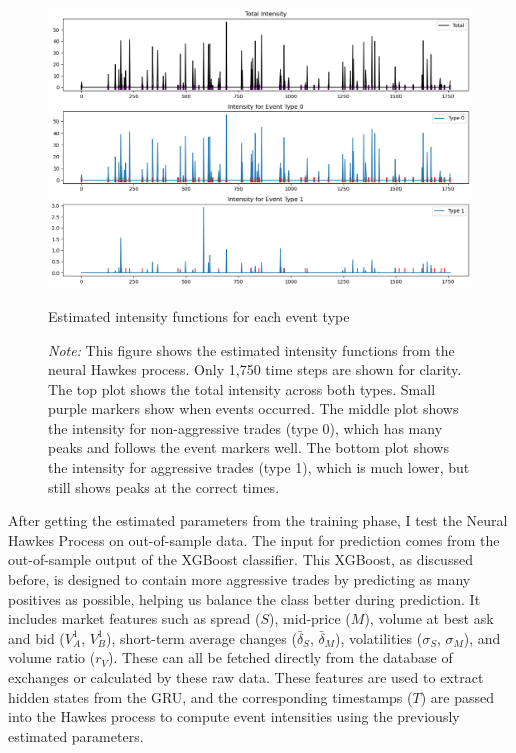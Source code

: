 \begin{figure}[tbp]
    \centering
    \includegraphics[width=0.95\linewidth]{figures/hp_estimation.png}
    \caption{Estimated intensity functions for each event type}
    \caption*{\textit{Note:} This figure shows the estimated intensity functions from the neural Hawkes process. Only 1,750 time steps are shown for clarity. The top plot shows the total intensity across both types. Small purple markers show when events occurred. The middle plot shows the intensity for non-aggressive trades (type 0), which has many peaks and follows the event markers well. The bottom plot shows the intensity for aggressive trades (type 1), which is much lower, but still shows peaks at the correct times.}

    \label{fig:neuralhp-intensity}
\end{figure}
\newpage
After getting the estimated parameters from the training phase, I test the Neural Hawkes Process on out-of-sample data. The input for prediction comes from the out-of-sample output of the XGBoost classifier. This XGBoost, as discussed before, is designed to contain more aggressive trades by predicting as many positives as possible, helping us balance the class better during prediction. It includes market features such as spread ($S$), mid-price ($M$), volume at best ask and bid ($V_A^1$, $V_B^1$), short-term average changes ($\bar{\delta}_S$, $\bar{\delta}_M$), volatilities ($\sigma_S$, $\sigma_M$), and volume ratio ($r_V$). These can all be fetched directly from the database of exchanges or calculated by these raw data. These features are used to extract hidden states from the GRU, and the corresponding timestamps ($T$) are passed into the Hawkes process to compute event intensities using the previously estimated parameters.

